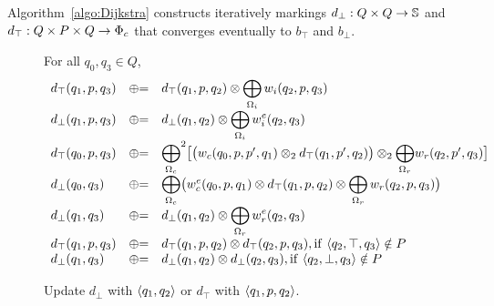 Algorithm~\ref{algo:Dijkstra}
constructs iteratively markings
$d_\bot : Q \times Q \to \mathbb{S}$ and
$d_\top : Q \times P \times Q \to \Phic$
that converges eventually to $b_\top$ and $b_\bot$.


\begin{figure}
For all $q_0, q_3 \in Q$, %
\[
\begin{array}{lcl}
d_\top(q_1, p, q_3) & \opluseq &
  d_\top(q_1, p, q_2) \otimes
  \displaystyle\bigoplus_{\Omegai} \weii(q_2, p, q_3)\\
%
d_\bot(q_1, p, q_3) & \opluseq &
  d_\bot(q_1, q_2) \otimes
  \displaystyle\bigoplus_{\Omegai} \weiei(q_2, q_3)\\
%
d_\top(q_0, p, q_3) & \opluseq &
  {\displaystyle\bigoplus_{\Omegac}}^2
  \bigl[ \bigl( \weic(q_0, p, p', q_1) \otimes_2
  d_\top(q_1, p', q_2) \bigr) \otimes_2
  {\displaystyle\bigoplus_{\Omegar}} \weir(q_2, p', q_3) \bigr]\\
%
d_\bot(q_0, q_3) & \opluseq &
  {\displaystyle\bigoplus_{\Omegac}}
  \bigl(
  \weiec(q_0, p, q_1) \otimes
   d_\top(q_1, p, q_2) \otimes
  \displaystyle\bigoplus_{\Omegar} \weir(q_2, p, q_3)\bigr)\\
%
d_\bot(q_1, q_3) & \opluseq &
  d_\bot(q_1, q_2) \otimes
  \displaystyle\bigoplus_{\Omegar} \weier(q_2, q_3)\\
%
d_\top(q_1, p, q_3) & \opluseq &
  d_\top(q_1, p, q_2) \otimes d_\top(q_2, p, q_3),
  \mathrm{if~} \< q_2, \top, q_3> \notin P \\
%
d_\bot(q_1, q_3) & \opluseq &
  d_\bot(q_1, q_2) \otimes d_\bot(q_2, q_3), \mathrm{if~} \< q_2, \bot, q_3> \notin P \\
\end{array}
\]
%
\caption{Update $d_\bot$ with $\<q_1, q_2>$ or $d_\top$ with $\< q_1, p, q_2>$.}
\label{fig:best-update}
\end{figure}


